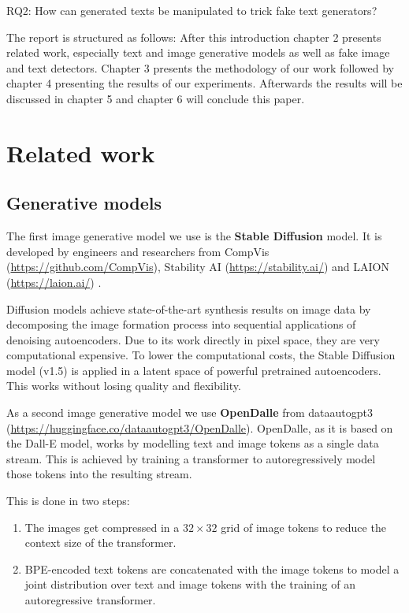 \documentclass{article} %
\begin{document}
RQ2: How can generated texts be manipulated to trick fake text generators?


The report is structured as follows: After this introduction chapter 2 presents related work, especially text and image generative models as well as fake image and text detectors. Chapter 3 presents the methodology of our work followed by chapter 4 presenting the results of our experiments. Afterwards the results will be discussed in chapter 5 and chapter 6 will conclude this paper.

\section{Related work}

\subsection{Generative models}

The first image generative model we use is the \textbf{Stable Diffusion} model. It is developed by engineers and researchers from CompVis (\url{https://github.com/CompVis}), Stability AI (\url{https://stability.ai/}) and LAION (\url{https://laion.ai/}) \cite{patil2022stable}.

Diffusion models achieve state-of-the-art synthesis results on image data by decomposing the image formation process into sequential applications of denoising autoencoders. Due to its work directly in pixel space, they are very computational expensive. To lower the computational costs, the Stable Diffusion model (v1.5) is applied in a latent space of powerful pretrained autoencoders. This works without losing quality and flexibility. \cite{Rombach_2022_CVPR}

As a second image generative model we use \textbf{OpenDalle} from dataautogpt3 (\url{https://huggingface.co/dataautogpt3/OpenDalle}). OpenDalle, as it is based on the Dall-E model, works by modelling text and image tokens as a single data stream. This is achieved by training a transformer to autoregressively model those tokens into the resulting stream.

This is done in two steps:
 
\begin{enumerate}
	\item The images get compressed in a $32 \times 32$ grid of image tokens to reduce the context size of the transformer.
	\item BPE-encoded text tokens are concatenated with the image tokens to model a joint distribution over text and image tokens with the training of an autoregressive transformer.
\end{enumerate}
\end{document}
